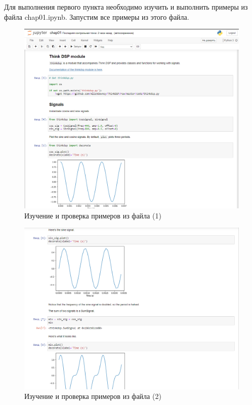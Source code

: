 \documentclass[a4]{article}
\begin{document}
    Для выполнения первого пункта необходимо изучить и выполнить примеры из файла chap01.ipynb.
    Запустим все примеры из этого файла.

    \begin{figure}[h]
        \centering
        \includegraphics[width=\textwidth]{1}
        \caption{Изучение и проверка примеров из файла (1)}
        \label{fig:check_it_works_1}
    \end{figure}

    \begin{figure}[h]
        \centering
        \includegraphics[width=\textwidth]{2}
        \caption{Изучение и проверка примеров из файла (2)}
        \label{fig:check_it_works_2}
    \end{figure}
\end{document}
